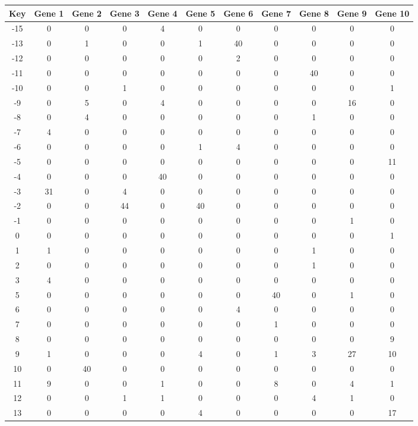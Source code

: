 \begin{tabular}{|c|c|c|c|c|c|c|c|c|c|c|}
\hline
Key & Gene 1 & Gene 2 & Gene 3 & Gene 4 & Gene 5 & Gene 6 & Gene 7 & Gene 8 & Gene 9 & Gene 10 \\
\hline
-15 & 0 & 0 & 0 & 4 & 0 & 0 & 0 & 0 & 0 & 0 \\
-13 & 0 & 1 & 0 & 0 & 1 & 40 & 0 & 0 & 0 & 0 \\
-12 & 0 & 0 & 0 & 0 & 0 & 2 & 0 & 0 & 0 & 0 \\
-11 & 0 & 0 & 0 & 0 & 0 & 0 & 0 & 40 & 0 & 0 \\
-10 & 0 & 0 & 1 & 0 & 0 & 0 & 0 & 0 & 0 & 1 \\
-9 & 0 & 5 & 0 & 4 & 0 & 0 & 0 & 0 & 16 & 0 \\
-8 & 0 & 4 & 0 & 0 & 0 & 0 & 0 & 1 & 0 & 0 \\
-7 & 4 & 0 & 0 & 0 & 0 & 0 & 0 & 0 & 0 & 0 \\
-6 & 0 & 0 & 0 & 0 & 1 & 4 & 0 & 0 & 0 & 0 \\
-5 & 0 & 0 & 0 & 0 & 0 & 0 & 0 & 0 & 0 & 11 \\
-4 & 0 & 0 & 0 & 40 & 0 & 0 & 0 & 0 & 0 & 0 \\
-3 & 31 & 0 & 4 & 0 & 0 & 0 & 0 & 0 & 0 & 0 \\
-2 & 0 & 0 & 44 & 0 & 40 & 0 & 0 & 0 & 0 & 0 \\
-1 & 0 & 0 & 0 & 0 & 0 & 0 & 0 & 0 & 1 & 0 \\
0 & 0 & 0 & 0 & 0 & 0 & 0 & 0 & 0 & 0 & 1 \\
1 & 1 & 0 & 0 & 0 & 0 & 0 & 0 & 1 & 0 & 0 \\
2 & 0 & 0 & 0 & 0 & 0 & 0 & 0 & 1 & 0 & 0 \\
3 & 4 & 0 & 0 & 0 & 0 & 0 & 0 & 0 & 0 & 0 \\
5 & 0 & 0 & 0 & 0 & 0 & 0 & 40 & 0 & 1 & 0 \\
6 & 0 & 0 & 0 & 0 & 0 & 4 & 0 & 0 & 0 & 0 \\
7 & 0 & 0 & 0 & 0 & 0 & 0 & 1 & 0 & 0 & 0 \\
8 & 0 & 0 & 0 & 0 & 0 & 0 & 0 & 0 & 0 & 9 \\
9 & 1 & 0 & 0 & 0 & 4 & 0 & 1 & 3 & 27 & 10 \\
10 & 0 & 40 & 0 & 0 & 0 & 0 & 0 & 0 & 0 & 0 \\
11 & 9 & 0 & 0 & 1 & 0 & 0 & 8 & 0 & 4 & 1 \\
12 & 0 & 0 & 1 & 1 & 0 & 0 & 0 & 4 & 1 & 0 \\
13 & 0 & 0 & 0 & 0 & 4 & 0 & 0 & 0 & 0 & 17 \\
\hline
\end{tabular}